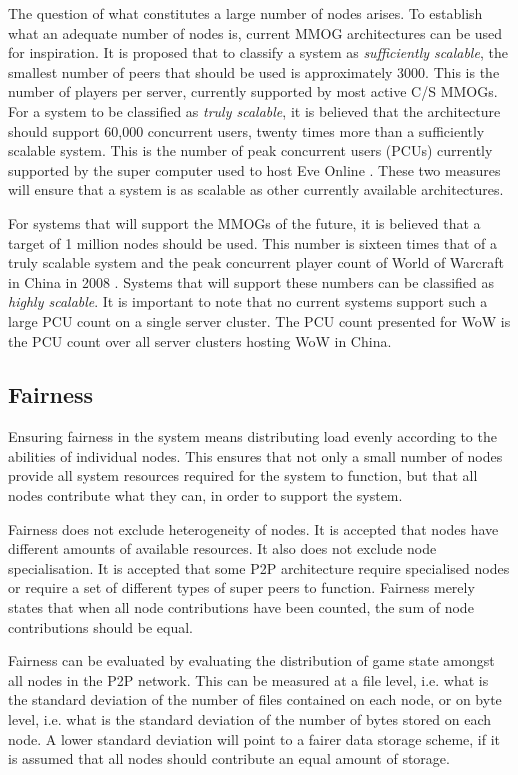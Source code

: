 The question of what constitutes a large number of nodes arises. To establish what an adequate number of nodes is, current MMOG architectures can be
used for inspiration. It is proposed that to classify a system as \emph{sufficiently scalable}, the smallest number of peers that should be used is
approximately 3000. This is the number of players per server, currently supported by most active C/S MMOGs. For a system to be classified as
\emph{truly scalable}, it is believed that the architecture should support 60,000 concurrent users, twenty times more than a sufficiently scalable
system. This is the number of peak concurrent users (PCUs) currently supported by the super computer used to host Eve Online \cite{eve_pcu}. These
two measures will ensure that a system is as scalable as other currently available architectures.

For systems that will support the MMOGs of the future, it is believed that a target of 1 million nodes should be used. This number is sixteen times
that of a truly scalable system and the peak concurrent player count of World of Warcraft in China in 2008 \cite{WoW_china_pcu}. Systems that will
support these numbers can be classified as \emph{highly scalable}. It is important to note that no current systems support such a large PCU count on
a single server cluster. The PCU count presented for WoW is the PCU count over all server clusters hosting WoW in China.

\subsection{Fairness}
Ensuring fairness in the system means distributing load evenly according to the abilities of individual nodes. This ensures that not only a small
number of nodes provide all system resources required for the system to function, but that all nodes contribute what they can, in order to support
the system.

Fairness does not exclude heterogeneity of nodes. It is accepted that nodes have different amounts of available resources. It also does not exclude node specialisation. It is accepted that some P2P architecture require specialised nodes or require a set of different types of super peers to function. Fairness merely states that when all node contributions have been counted, the sum of node contributions should be equal.

Fairness can be evaluated by evaluating the distribution of game state amongst all nodes in the P2P network. This can be measured at a file level,
i.e. what is the standard deviation of the number of files contained on each node, or on byte level, i.e. what is the standard deviation of the number of bytes stored on
each node. A lower standard deviation will point to a fairer data storage scheme, if it is assumed that all nodes should contribute an equal amount of storage.

